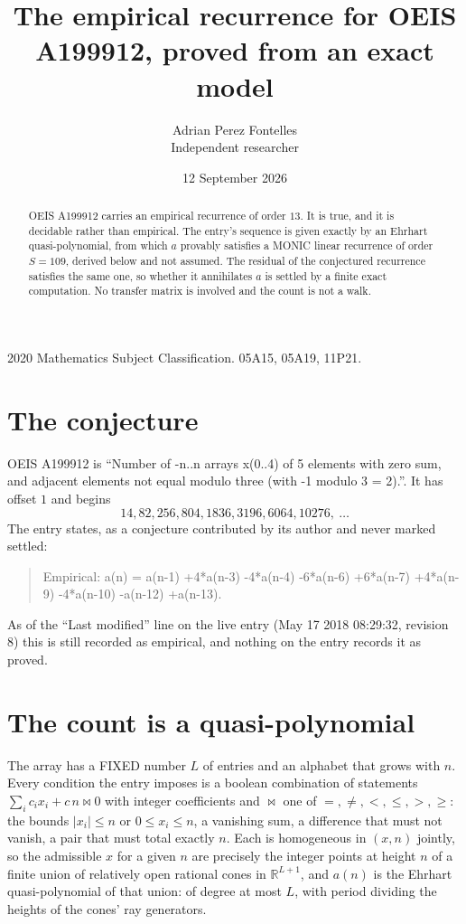 \documentclass[11pt,a4paper]{article}
\title{The empirical recurrence for OEIS A199912, proved from an exact model}
\author{Adrian Perez Fontelles\\ \small Independent researcher}
\date{12 September 2026}
\theoremstyle{plain}
\theoremstyle{definition}
\begin{document}
\maketitle

\begin{abstract}
OEIS A199912 carries an empirical recurrence of order $13$. It is true, and it is
decidable rather than empirical. The entry's sequence is given exactly by an Ehrhart quasi-polynomial, from
which $a$ provably satisfies a MONIC linear recurrence of order $S=109$, derived below and not
assumed. The residual of the conjectured recurrence satisfies the same one, so whether it
annihilates $a$ is settled by a finite exact computation. No transfer matrix is involved and
the count is not a walk.
\end{abstract}

\noindent\small 2020 Mathematics Subject Classification. 05A15, 05A19, 11P21.\normalsize

\section{The conjecture}

OEIS A199912 is ``Number of -n..n arrays x(0..4) of 5 elements with zero sum, and adjacent elements not equal modulo three (with -1 modulo 3 = 2).''. It has offset $1$ and begins
\[
14, 82, 256, 804, 1836, 3196, 6064, 10276,\ \dots
\]
The entry states, as a conjecture contributed by its author and never marked settled:
\begin{quote}
Empirical: a(n) = a(n-1) +4*a(n-3) -4*a(n-4) -6*a(n-6) +6*a(n-7) +4*a(n-9) -4*a(n-10) -a(n-12) +a(n-13).
\end{quote}
As of the ``Last modified'' line on the live entry (May 17 2018 08:29:32, revision 8)
this is still recorded as empirical, and nothing on the entry records it as proved.

\section{The count is a quasi-polynomial}

The array has a FIXED number $L$ of entries and an alphabet that grows with $n$. Every
condition the entry imposes is a boolean combination of statements
$\sum_i c_ix_i + c\,n \bowtie 0$ with integer coefficients and $\bowtie$ one of
$=,\ne,<,\le,>,\ge$: the bounds $|x_i|\le n$ or $0\le x_i\le n$, a vanishing sum, a difference
that must not vanish, a pair that must total exactly $n$. Each is homogeneous in $(x,n)$
jointly, so the admissible $x$ for a given $n$ are precisely the integer points at height $n$
of a finite union of relatively open rational cones in $\mathbb{R}^{L+1}$, and $a(n)$ is
the Ehrhart quasi-polynomial of that union: of degree at most $L$, with period dividing the
heights of the cones' ray generators.
\end{document}

